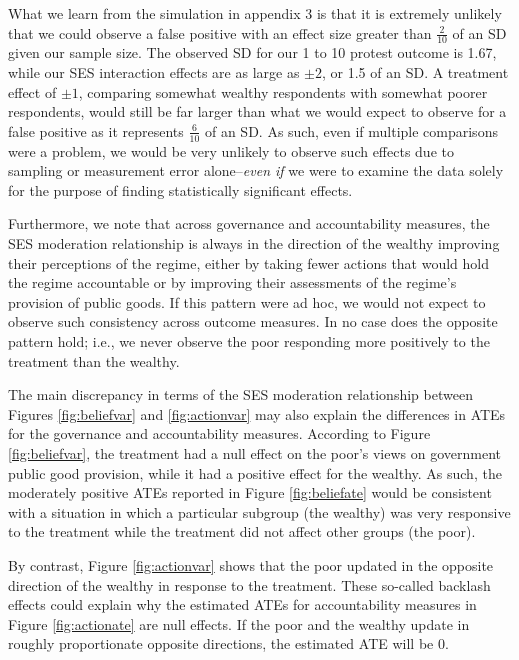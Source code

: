 \documentclass[12pt, letterpaper]{article}
\begin{document}
What we learn from the simulation in appendix 3 is that it is extremely unlikely that we could observe a false positive with an effect size greater than $\frac{2}{10}$ of an SD given our sample size. The observed SD for our 1 to 10 protest outcome is 1.67, while our SES interaction effects are as large as $\pm2$, or 1.5 of an SD. A treatment effect of $\pm1$, comparing somewhat wealthy respondents with somewhat poorer respondents, would still be far larger than what we would expect to observe for a false positive as it represents $\frac{6}{10}$ of an SD. As such, even if multiple comparisons were a problem, we would be very unlikely to observe such effects due to sampling or measurement error alone--\textit{even if }we were to examine the data solely for the purpose of finding statistically significant effects.

Furthermore, we note that across governance and accountability measures, the SES moderation relationship is always in the direction of the wealthy improving their perceptions of the regime, either by taking fewer actions that would hold the regime accountable or by improving their assessments of the regime's provision of public goods. If this pattern were ad hoc, we would not expect to observe such consistency across outcome measures. In no case does the opposite pattern hold; i.e., we never observe the poor responding more positively to the treatment than the wealthy. 

The main discrepancy in terms of the SES moderation relationship between Figures \ref{fig:beliefvar} and \ref{fig:actionvar} may also explain the differences in ATEs for the governance and accountability measures. According to Figure \ref{fig:beliefvar}, the treatment had a null effect on the poor's views on government public good provision, while it had a positive effect for the wealthy. As such, the moderately positive ATEs reported in Figure \ref{fig:beliefate} would be consistent with a situation in which a particular subgroup (the wealthy) was very responsive to the treatment while the treatment did not affect other groups (the poor).

By contrast, Figure \ref{fig:actionvar} shows that the poor updated in the opposite direction of the wealthy in response to the treatment. These so-called backlash effects could explain why the estimated ATEs for accountability measures in Figure \ref{fig:actionate} are null effects. If the poor and the wealthy update in roughly proportionate opposite directions, the estimated ATE will be 0. 
\end{document}
